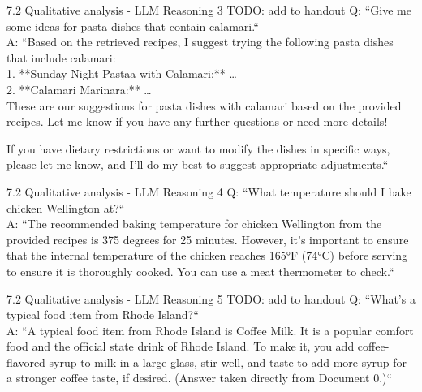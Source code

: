 \documentclass{beamer}
\begin{document}
\begin{frame}{7.2 Qualitative analysis - LLM Reasoning 3}
  TODO: add to handout
  Q: ``Give me some ideas for pasta dishes that contain calamari.``\\
  A: ``Based on the retrieved recipes, I suggest trying the following pasta dishes that include calamari:\\
  1. **Sunday Night Pastaa with Calamari:** \ldots\\
  2. **Calamari Marinara:** \ldots\\

  These are our suggestions for pasta dishes with calamari based on the provided recipes. Let me know if you have any further questions or need more details!

  If you have dietary restrictions or want to modify the dishes in specific ways, please let me know, and I'll do my best to suggest appropriate adjustments.``
\end{frame}

\begin{frame}{7.2 Qualitative analysis - LLM Reasoning 4}
  Q: ``What temperature should I bake chicken Wellington at?``\\
  A: ``The recommended baking temperature for chicken Wellington from the provided recipes is 375 degrees
  for 25 minutes. However, it's important to ensure that the internal temperature of the chicken reaches 165°F (74°C)
  before serving to ensure it is thoroughly cooked. You can use a meat thermometer to check.``
\end{frame}

\begin{frame}{7.2 Qualitative analysis - LLM Reasoning 5}
  TODO: add to handout
  Q: ``What's a typical food item from Rhode Island?``\\
  A: ``A typical food item from Rhode Island is Coffee Milk. It is a popular comfort food and the
  official state drink of Rhode Island. To make it, you add coffee-flavored syrup to milk in a large glass,
  stir well, and taste to add more syrup for a stronger coffee taste, if desired. (Answer taken directly from Document 0.)``
\end{frame}
\end{document}
